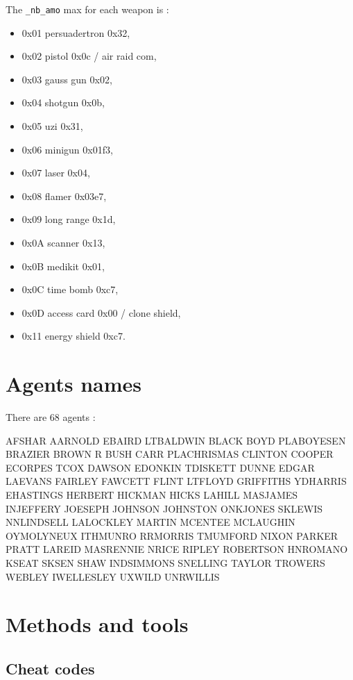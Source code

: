 \documentclass[a4paper,twoside,12pt,dvips]{article}
\begin{document}
The \texttt{\_nb\_amo} max for each weapon is :
\begin{itemize}
\item 0x01 persuadertron 0x32,
\item 0x02 pistol 0x0c / air raid com,
\item 0x03 gauss gun 0x02,
\item 0x04 shotgun 0x0b,
\item 0x05 uzi 0x31,
\item 0x06 minigun 0x01f3,
\item 0x07 laser 0x04,
\item 0x08 flamer 0x03e7,
\item 0x09 long range 0x1d,
\item 0x0A scanner 0x13,
\item 0x0B medikit 0x01,
\item 0x0C time bomb 0xc7,
\item 0x0D access card 0x00 / clone shield,
\item 0x11 energy shield 0xc7.
\end{itemize}

\section{Agents names}
\label{sec:agentsnames}

There are 68 agents :

AFSHAR
AARNOLD
EBAIRD
LTBALDWIN
BLACK
BOYD
PLABOYESEN
BRAZIER
BROWN
R BUSH
CARR
PLACHRISMAS
CLINTON
COOPER
ECORPES
TCOX
DAWSON
EDONKIN
TDISKETT
DUNNE
EDGAR
LAEVANS
FAIRLEY
FAWCETT
FLINT
LTFLOYD
GRIFFITHS
YDHARRIS
EHASTINGS
HERBERT
HICKMAN
HICKS
LAHILL
MASJAMES
INJEFFERY
JOESEPH
JOHNSON
JOHNSTON
ONKJONES
SKLEWIS
NNLINDSELL
LALOCKLEY
MARTIN
MCENTEE
MCLAUGHIN
OYMOLYNEUX
ITHMUNRO
RRMORRIS
TMUMFORD
NIXON
PARKER
PRATT
LAREID
MASRENNIE
NRICE
RIPLEY
ROBERTSON
HNROMANO
KSEAT
SKSEN
SHAW
INDSIMMONS
SNELLING
TAYLOR
TROWERS
WEBLEY
IWELLESLEY
UXWILD
UNRWILLIS

\section{Methods and tools}
\label{sec:methodsandtools}

\subsection{Cheat codes}
\label{sec:cheat}
\end{document}
